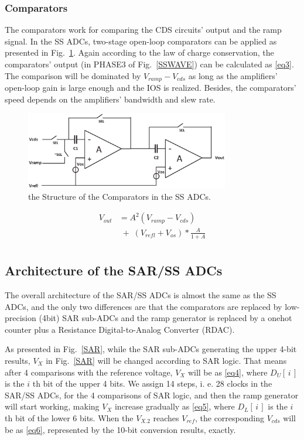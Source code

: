\documentclass[conference]{IEEEtran}
\begin{document}
\subsubsection{Comparators}
The comparators work for comparing the CDS circuits' output and the ramp signal. In the SS ADCs, two-stage open-loop comparators can be applied as presented in Fig.~\ref{COM}. Again according to the law of charge conservation, the comparators’ output (in PHASE3 of Fig.~\ref{SSWAVE}) can be calculated as \eqref{eq3}. The comparison will be dominated by $V_{ramp}-V_{cds}$ as long as the amplifiers’ open-loop gain is large enough and the IOS is realized. Besides, the comparators’ speed depends on the amplifiers’ bandwidth and slew rate.
\begin{figure}[htbp]
	\centerline{\includegraphics[width=3.5in]{./Figures/COM.eps}}
	\caption{the Structure of the Comparators in the SS ADCs.}
	\label{COM}
\end{figure} 
\begin{equation}
	\begin{aligned}
		V_{out}&=A^2(V_{ramp}-V_{cds})\\
		&\;{+}\;\left(V_{refl}+V_{os}\right)\ast\frac{A}{1+A}\\ 		
		\label{eq3}
	\end{aligned}
\end{equation}

\subsection{Architecture of the SAR/SS ADCs}

The overall architecture of the SAR/SS ADCs is almost the same as the SS ADCs, and the only two differences are that the comparators are replaced by low-precision (4bit) SAR sub-ADCs and
the ramp generator is replaced by a onehot counter plus a Resistance Digital-to-Analog Converter (RDAC).

As presented in Fig.~\ref{SAR}, while the SAR sub-ADCs generating the upper 4-bit results, $V_{X}$ in Fig.~\ref{SAR} will be changed according to SAR logic. That means after 4 comparisons 
with the reference voltage, $V_{X}$ will be as \eqref{eq4}, where $D_{U}\left[\,i\,\right]$ is the $i$ th bit of the upper 4 bits. We assign 14 steps, i. e. 28 clocks in the SAR/SS ADCs, 
for the 4 comparisons of SAR logic, and then the ramp generator will start working, making $V_{X}$ increase gradually as \eqref{eq5}, where $D_{L}\left[\,i\,\right]$ is the $i$ th bit of the lower 6 bits. 
When the $V_{X.2}$ reaches $V_{ref}$, the corresponding $V_{cds}$ will be as \eqref{eq6}, represented by the 10-bit conversion results, exactly.
\end{document}
